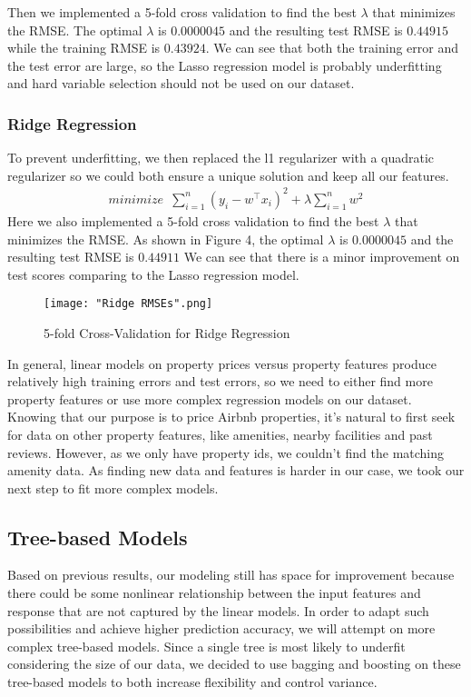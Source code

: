 \documentclass[twocolumn]{article}
\begin{document}
Then we implemented a 5-fold cross validation to find the best $\lambda$ that minimizes the RMSE. The optimal $\lambda$ is $0.0000045$ and the resulting test RMSE is $0.44915$ while the training RMSE is $0.43924$. We can see that both the training error and the test error are large, so the Lasso regression model is probably underfitting and hard variable selection should not be used on our dataset. 

\subsubsection{Ridge Regression}
To prevent underfitting, we then replaced the l1 regularizer with a quadratic regularizer so we could both ensure a unique solution and keep all our features. 
\begin{align}  
    \displaystyle{minimize \enspace \sum\limits_{i=1}^{n}(y_i - w^\intercal x_i)^2 + \lambda \sum\limits_{i=1}^{n} w^2}
\end{align}
Here we also implemented a 5-fold cross validation to find the best $\lambda$ that minimizes the RMSE. As shown in Figure 4, the optimal $\lambda$ is $0.0000045$ and the resulting test RMSE is $0.44911$ We can see that there is a minor improvement on test scores comparing to the Lasso regression model. 

\begin{figure}[h]
    \centering
    \texttt{[image: "Ridge RMSEs".png]}
    \caption{5-fold Cross-Validation for Ridge Regression}
\end{figure}

In general, linear models on property prices versus property features produce relatively high training errors and test errors, so we need to either find more property features or use more complex regression models on our dataset. Knowing that our purpose is to price Airbnb properties, it's natural to first seek for data on other property features, like amenities, nearby facilities and past reviews. However, as we only have property ids, we couldn't find the matching amenity data. As finding new data and features is harder in our case, we took our next step to fit more complex models.

\subsection{Tree-based Models}

Based on previous results, our modeling still has space for improvement because there could be some nonlinear relationship between the input features and response that are not captured by the linear models. In order to adapt such possibilities and achieve higher prediction accuracy, we will attempt on more complex tree-based models. Since a single tree is most likely to underfit considering the size of our data, we decided to use bagging and boosting on these tree-based models to both increase flexibility and control variance.
\end{document}
